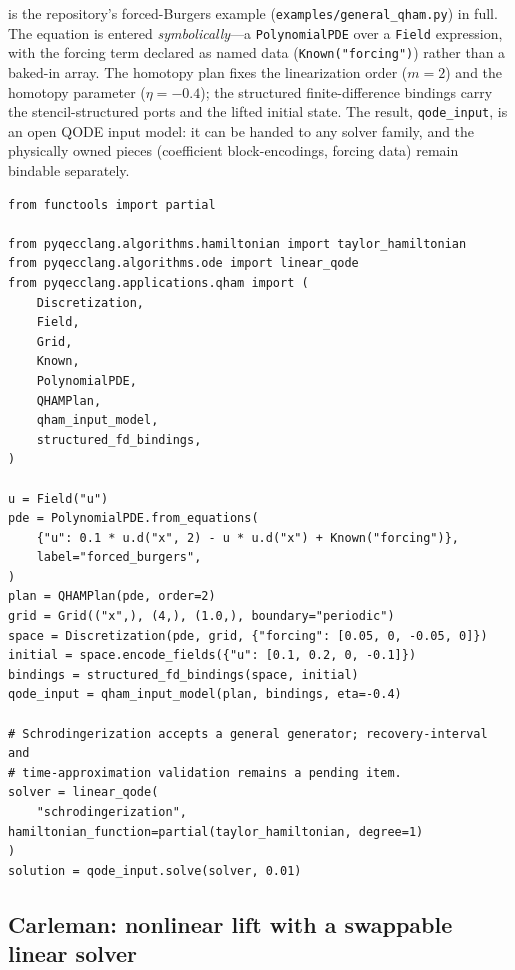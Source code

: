  is the repository's forced-Burgers example
(\texttt{examples/general\_qham.py}) in full.  The equation is entered
\emph{symbolically}---a \texttt{PolynomialPDE} over a \texttt{Field}
expression, with the forcing term declared as named data
(\texttt{Known("forcing")}) rather than a baked-in array.  The homotopy
plan fixes the linearization order ($m=2$) and the homotopy parameter
($\eta=-0.4$); the structured finite-difference bindings carry the
stencil-structured ports and the lifted initial state.  The result,
\texttt{qode\_input}, is an open QODE input model: it can be handed to any
solver family, and the physically owned pieces (coefficient block-encodings,
forcing data) remain bindable separately.

\begin{lstlisting}[style=pyqpython, caption={QHAM end to end: symbolic polynomial PDE, homotopy-analysis plan, structured discretization, and a solver handed in from outside (verbatim from the doctested example \texttt{examples/general\_qham.py}; comments translated).}, label={lst:qham}]
from functools import partial

from pyqecclang.algorithms.hamiltonian import taylor_hamiltonian
from pyqecclang.algorithms.ode import linear_qode
from pyqecclang.applications.qham import (
    Discretization,
    Field,
    Grid,
    Known,
    PolynomialPDE,
    QHAMPlan,
    qham_input_model,
    structured_fd_bindings,
)

u = Field("u")
pde = PolynomialPDE.from_equations(
    {"u": 0.1 * u.d("x", 2) - u * u.d("x") + Known("forcing")},
    label="forced_burgers",
)
plan = QHAMPlan(pde, order=2)
grid = Grid(("x",), (4,), (1.0,), boundary="periodic")
space = Discretization(pde, grid, {"forcing": [0.05, 0, -0.05, 0]})
initial = space.encode_fields({"u": [0.1, 0.2, 0, -0.1]})
bindings = structured_fd_bindings(space, initial)
qode_input = qham_input_model(plan, bindings, eta=-0.4)

# Schrodingerization accepts a general generator; recovery-interval and
# time-approximation validation remains a pending item.
solver = linear_qode(
    "schrodingerization", hamiltonian_function=partial(taylor_hamiltonian, degree=1)
)
solution = qode_input.solve(solver, 0.01)
\end{lstlisting}

\subsection{Carleman: nonlinear lift with a swappable linear solver}
\label{app:carleman}

